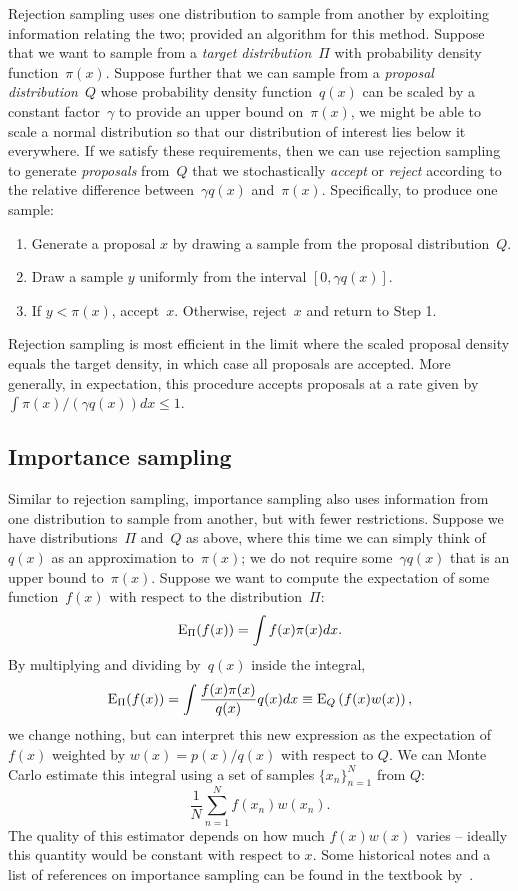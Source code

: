 \documentclass[angelino.tex]{subfiles}
\begin{document}
Rejection sampling uses one distribution to sample from another
by exploiting information relating the two;
\citet{von-Neumann:1951-random} provided an algorithm for this method.
Suppose that we want to sample from a \emph{target distribution}~$\Pi$ with
probability density function~$\pi(x)$.
Suppose further that we can sample from a \emph{proposal distribution}~$Q$
whose probability density function~$q(x)$ can be scaled by a
constant factor~$\gamma$ to provide an upper bound on~$\pi(x)$,
\eg we might be able to scale a normal distribution so that our distribution of
interest lies below it everywhere.
If we satisfy these requirements, then we can use
rejection sampling to generate \emph{proposals} from~$Q$ that we stochastically
\emph{accept} or \emph{reject} according to the relative difference
between~$\gamma q(x)$ and~$\pi(x)$. Specifically, to produce one sample:
\begin{enumerate}
\item Generate a proposal $x$ by drawing a sample from the
      proposal distribution~$Q$.
\item Draw a sample $y$ uniformly from the interval $[0, \gamma q(x)]$.
\item If $y < \pi(x)$, accept~$x$.
      Otherwise, reject~$x$ and return to Step 1.
\end{enumerate}
Rejection sampling is most efficient in the limit where the scaled proposal
density equals the target density, in which case all proposals are accepted.
More generally, in expectation, this procedure accepts proposals at a rate given
by~$\int \pi(x) / (\gamma q(x)) dx \le 1$.

\subsection{Importance sampling}

Similar to rejection sampling, importance sampling also uses information from
one distribution to sample from another, but with fewer restrictions.
Suppose we have distributions~$\Pi$ and~$Q$ as above, where this time we
can simply think of~$q(x)$ as an approximation to~$\pi(x)$;
\ie we do not require some~$\gamma q(x)$ that is an upper bound to~$\pi(x)$.
Suppose we want to compute the expectation of some function~$f(x)$ with
respect to the distribution~$\Pi$:
\[
\mbox{E}_\Pi (f(x)) = \int f(x) \pi(x) dx.
\]
By multiplying and dividing by~$q(x)$ inside the integral,
\[
\mbox{E}_\Pi (f(x)) = \int \frac{f(x) \pi(x)}{q(x)} q(x) dx
\equiv \mbox{E}_Q \left(f(x) w(x) \right),
\]
we change nothing, but can interpret this new expression as the
expectation of $f(x)$ weighted by $w(x) = p(x) / q(x)$ with respect to $Q$.
We can Monte Carlo estimate this integral using a set of samples
$\{x_n\}_{n=1}^N$ from $Q$:
\[
\frac{1}{N} \sum_{n=1}^N f(x_n) w(x_n).
\]
The quality of this estimator depends on how much $f(x) w(x)$ varies --
ideally this quantity would be constant with respect to $x$.
Some historical notes and a list of references on importance sampling can be
found in the textbook by~\citet{gelman:1993-bda}.
\end{document}
